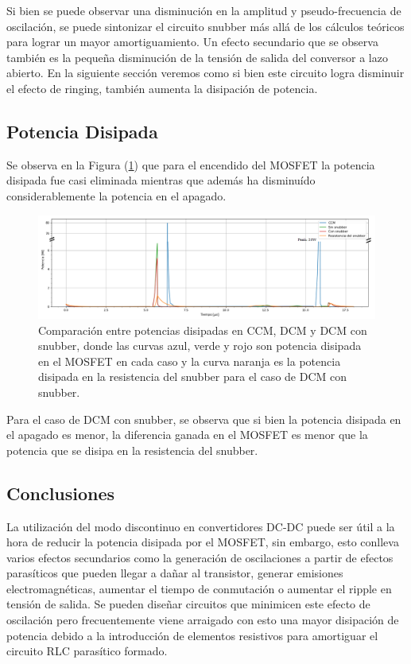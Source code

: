 Si bien se puede observar una disminución en la amplitud y pseudo-frecuencia de oscilación, se puede sintonizar el circuito snubber más allá de los cálculos teóricos para lograr un mayor amortiguamiento. Un efecto secundario que se observa también es la pequeña disminución de la tensión de salida del conversor a lazo abierto. En la siguiente sección veremos como si bien este circuito logra disminuir el efecto de ringing, también aumenta la disipación de potencia.

\subsection{Potencia Disipada}

Se observa en la Figura (\ref{ej4:fig:pots}) que para el encendido del MOSFET la potencia disipada fue casi eliminada mientras que además ha disminuído considerablemente la potencia en el apagado.

\begin{figure}[H]
	\centering
	\includegraphics[width=0.9\linewidth]{ImagenesEjercicio-4/potencias-crop-partidas}
	\caption{Comparación entre potencias disipadas en CCM, DCM y DCM con snubber, donde las curvas azul, verde y rojo son potencia disipada en el MOSFET en cada caso y la curva naranja es la potencia disipada en la resistencia del snubber para el caso de DCM con snubber.}
	\label{ej4:fig:pots}
\end{figure}

Para el caso de DCM con snubber, se observa que si bien la potencia disipada en el apagado es menor, la diferencia ganada en el MOSFET es menor que la potencia que se disipa en la resistencia del snubber.


\subsection{Conclusiones}
La utilización del modo discontinuo en convertidores DC-DC puede ser útil a la hora de reducir la potencia disipada por el MOSFET, sin embargo, esto conlleva varios efectos secundarios como la generación de oscilaciones a partir de efectos parasíticos que pueden llegar a dañar al transistor, generar emisiones electromagnéticas, aumentar el tiempo de conmutación o aumentar el ripple en tensión de salida. Se pueden diseñar circuitos que minimicen este efecto de oscilación pero frecuentemente viene arraigado con esto una mayor disipación de potencia debido a la introducción de elementos resistivos para amortiguar el circuito RLC parasítico formado.

%
